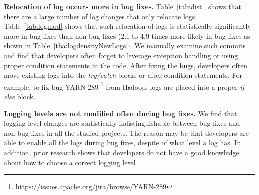 
\textbf{Relocation of log occurs more in bug fixes.} Table~\ref{tab:dist}, shows that there are a large number of log changes that only relocate logs. Table~\ref{tab:logmod} shows that such relocation of logs is statistically significantly more in bug fixes than non-bug fixes ($2.0$ to $4.9$ times more likely in bug fixes as shown in Table~\ref{tba:logdensityNewLogs}). We manually examine such commits and find that developers often forget to leverage exception handling or using proper condition statements in the code. After fixing the bugs, developers often move existing logs into the \emph{try/catch} blocks or after condition statements. For example, to fix bug YARN-289 \footnote{https://issues.apache.org/jira/browse/YARN-289} from Hadoop, logs are placed into a proper \emph{if-else} block.

\textbf{Logging levels are not modified often during bug fixes.} We find that logging level changes are statistically indistinguishable between bug fixes and non-bug fixes in all the studied projects. The reason may be that developers are able to enable all the logs during bug fixes, despite of what level a log has. In addition, prior research shows that developers do not have a good knowledge about how to choose a correct logging level~\cite{Characterizinglogs}. 



